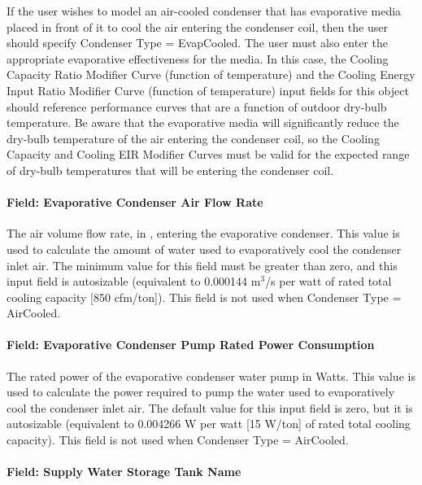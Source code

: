 If the user wishes to model an air-cooled condenser that has evaporative media placed in front of it to cool the air entering the condenser coil, then the user should specify Condenser Type = EvapCooled. The user must also enter the appropriate evaporative effectiveness for the media. In this case, the Cooling Capacity Ratio Modifier Curve (function of temperature) and the Cooling Energy Input Ratio Modifier Curve (function of temperature) input fields for this object should reference performance curves that are a function of outdoor dry-bulb temperature. Be aware that the evaporative media will significantly reduce the dry-bulb temperature of the air entering the condenser coil, so the Cooling Capacity and Cooling EIR Modifier Curves must be valid for the expected range of dry-bulb temperatures that will be entering the condenser coil.

\paragraph{Field: Evaporative Condenser Air Flow Rate}\label{field-evaporative-condenser-air-flow-rate-002}

The air volume flow rate, in \si{\volumeFlowRate}, entering the evaporative condenser. This value is used to calculate the amount of water used to evaporatively cool the condenser inlet air. The minimum value for this field must be greater than zero, and this input field is autosizable (equivalent to 0.000144 m\(^{3}\)/s per watt of rated total cooling capacity {[}850 cfm/ton{]}). This field is not used when Condenser Type = AirCooled.

\paragraph{Field: Evaporative Condenser Pump Rated Power Consumption}\label{field-evaporative-condenser-pump-rated-power-consumption-001}

The rated power of the evaporative condenser water pump in Watts. This value is used to calculate the power required to pump the water used to evaporatively cool the condenser inlet air. The default value for this input field is zero, but it is autosizable (equivalent to 0.004266 W per watt {[}15 W/ton{]} of rated total cooling capacity). This field is not used when Condenser Type = AirCooled.

\paragraph{Field: Supply Water Storage Tank Name}\label{field-supply-water-storage-tank-name-001}

